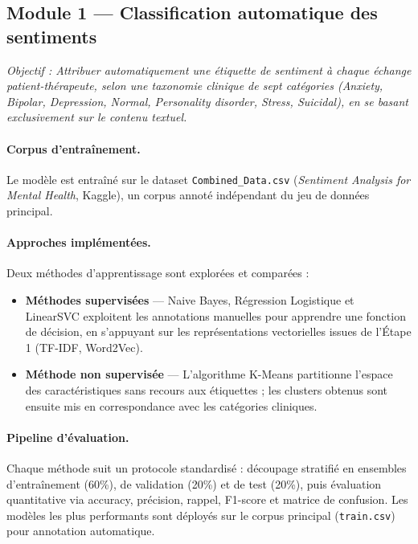 \documentclass[12pt,a4paper]{report}
\begin{document}
\subsection{Module 1 — Classification automatique des sentiments}

\textit{Objectif : Attribuer automatiquement une étiquette de sentiment à chaque échange patient-thérapeute, selon une taxonomie clinique de sept catégories (Anxiety, Bipolar, Depression, Normal, Personality disorder, Stress, Suicidal), en se basant exclusivement sur le contenu textuel.}

\paragraph{Corpus d'entraînement.} Le modèle est entraîné sur le dataset \texttt{Combined\_Data.csv} (\textit{Sentiment Analysis for Mental Health}, Kaggle), un corpus annoté indépendant du jeu de données principal.

\paragraph{Approches implémentées.} Deux méthodes d'apprentissage sont explorées et comparées :

\begin{itemize}
    \item \textbf{Méthodes supervisées} — Naive Bayes, Régression Logistique et LinearSVC exploitent les annotations manuelles pour apprendre une fonction de décision, en s'appuyant sur les représentations vectorielles issues de l'Étape 1 (TF-IDF, Word2Vec).
    \item \textbf{Méthode non supervisée} — L'algorithme K-Means partitionne l'espace des caractéristiques sans recours aux étiquettes ; les clusters obtenus sont ensuite mis en correspondance avec les catégories cliniques.
\end{itemize}

\paragraph{Pipeline d'évaluation.} Chaque méthode suit un protocole standardisé : découpage stratifié en ensembles d'entraînement (60\%), de validation (20\%) et de test (20\%), puis évaluation quantitative via accuracy, précision, rappel, F1-score et matrice de confusion. Les modèles les plus performants sont déployés sur le corpus principal (\texttt{train.csv}) pour annotation automatique.
\end{document}
